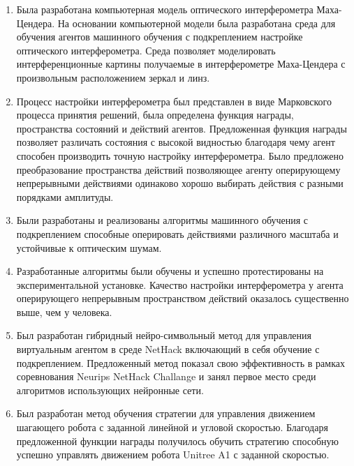 \begin{enumerate}
  \item Была разработана компьютерная модель оптического интерферометра Маха-Цендера. На основании компьютерной модели была разработана среда для обучения агентов машинного обучения с подкреплением настройке оптического интерферометра. Среда позволяет моделировать интерференционные картины получаемые в интерферометре Маха-Цендера с произвольным расположением зеркал и линз. 
  \item Процесс настройки интерферометра был представлен в виде Марковского процесса принятия решений, была определена функция награды, пространства состояний и действий агентов. Предложенная функция награды позволяет различать состояния с высокой видностью благодаря чему агент способен производить точную настройку интерферометра. Было предложено преобразование пространства действий позволяющее агенту оперирующему непрерывными действиями одинаково хорошо выбирать действия с разными порядками амплитуды. 
  \item Были разработаны и реализованы алгоритмы машинного обучения с подкреплением способные оперировать действиями различного масштаба и устойчивые к оптическим шумам. 
  \item Разработанные алгоритмы были обучены и успешно протестированы на экспериментальной установке. Качество настройки интерферометра у агента оперирующего непрерывным пространством действий оказалось существенно выше, чем у человека. 
  \item Был разработан гибридный нейро-символьный метод для управления виртуальным агентом в среде NetHack включающий в себя обучение с подкреплением. Предложенный метод показал свою эффективность в рамках соревнования Neurips NetHack Challange и занял первое место среди алгоритмов использующих нейронные сети.
  \item Был разработан метод обучения стратегии для управления движением шагающего робота с заданной линейной и угловой скоростью. Благодаря предложенной функции награды получилось обучить стратегию способную успешно управлять движением робота Unitree A1 с заданной скоростью. 
\end{enumerate}

\newpage
